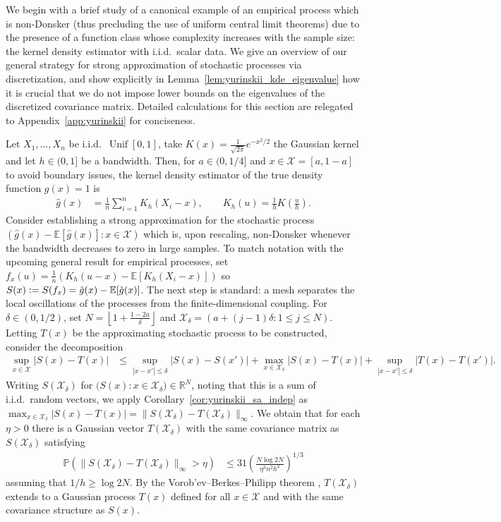 \documentclass[11pt,lof]{puthesis}
\renewcommand{\P}{\ensuremath{\mathbb{P}}}
\newcommand{\E}{\ensuremath{\mathbb{E}}}
\newcommand{\cX}{\ensuremath{\mathcal{X}}}
\DeclareMathOperator{\Unif}{Unif}
\theoremstyle{break}
\theoremstyle{proof}
\begin{document}
We begin with a brief study of a canonical example of an empirical process
which is non-Donsker (thus precluding the use of uniform central limit
theorems) due to the presence of a function class whose complexity increases
with the sample size: the kernel density estimator with i.i.d.\ scalar data.
We give an overview of our general strategy for
strong approximation of stochastic processes
via discretization, and show explicitly in
Lemma~\ref{lem:yurinskii_kde_eigenvalue}
how it is crucial
that we do not impose lower bounds on the eigenvalues of the discretized
covariance matrix. Detailed calculations for this section are
relegated to Appendix~\ref{app:yurinskii} for conciseness.

Let $X_1, \ldots, X_n$ be i.i.d.\ $\Unif[0,1]$, take
$K(x) = \frac{1}{\sqrt{2 \pi}} e^{-x^2/2}$ the Gaussian kernel and let
$h \in (0,1]$ be a bandwidth. Then, for $a \in (0,1/4]$ and
$x \in \cX = [a, 1-a]$ to avoid boundary issues, the kernel density estimator
of the true density function $g(x) = 1$ is
%
\begin{align*}
  \hat g(x)
  &=
  \frac{1}{n}
  \sum_{i=1}^{n}
  K_h( X_i - x),
  \qquad K_h(u) = \frac{1}{h} K\left( \frac{u}{h} \right).
\end{align*}
%
Consider establishing a strong approximation for the stochastic process
$(\hat g(x)-\E [ \hat g(x) ] : x\in\cX)$
which is, upon rescaling, non-Donsker whenever
the bandwidth decreases to zero in large samples.
To match notation with the upcoming
general result for empirical processes, set
$f_x(u) = \frac{1}{n} (K_h( u - x) - \E[K_h( X_i - x)])$
so $S(x) \vcentcolon= S(f_x) = \hat g(x)-\E [ \hat g(x) ]$.
The next step is standard: a
mesh separates the local oscillations of the processes from
the finite-dimensional coupling.
For $\delta \in (0,1/2)$, set
$N = \left\lfloor 1 + \frac{1 - 2a}{\delta} \right\rfloor$
and $\cX_\delta = (a + (j-1)\delta : 1 \leq j \leq N)$.
Letting $T(x)$ be the approximating stochastic
process to be constructed, consider the decomposition
%
\begin{align*}
  \sup_{x \in \cX}
  \big|S(x) - T(x)\big|
  &\leq
  \sup_{|x-x'| \leq \delta}
  \big|S(x) - S(x') \big|
  + \max_{x \in \cX_\delta}
  |S(x) - T(x)|
  + \sup_{|x-x'| \leq \delta}
  \big|T(x) - T(x')\big|.
\end{align*}
%
Writing $S(\cX_\delta)$ for
$\big(S(x) : x \in \cX_\delta\big)\in \mathbb{R}^N$,
noting that this is a sum of i.i.d.\ random vectors, we apply
Corollary~\ref{cor:yurinskii_sa_indep} as
$\max_{x \in \cX_\delta} |S(x) - T(x)|
= \| S(\cX_\delta) - T(\cX_\delta) \|_\infty$.
We obtain that for each $\eta > 0$ there is a Gaussian vector
$T(\cX_\delta)$ with the same covariance matrix as $S(\cX_\delta)$ satisfying
%
\begin{align*}
  \P\left(
    \|S(\cX_\delta) - T(\cX_\delta)\|_\infty > \eta
  \right)
  &\leq
  31 \left(
    \frac{N \log 2 N}{\eta^3 n^2 h^2}
  \right)^{1/3}
\end{align*}
%
assuming that $1/h \geq \log 2 N$.
By the Vorob'ev--Berkes--Philipp theorem
\citep[Theorem~1.1.10]{dudley1999uniform},
$T(\cX_\delta)$ extends to a Gaussian process $T(x)$
defined for all $x \in \cX$ and with the same covariance structure
as $S(x)$.
\end{document}
